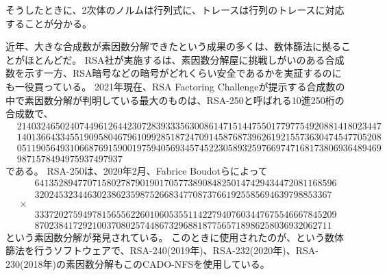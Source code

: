 そうしたときに、2次体のノルムは行列式に、トレースは行列のトレースに対応することが分かる。

近年、大きな合成数が素因数分解できたという成果の多くは、数体篩法に拠ることがほとんどだ。
RSA社が実施するは、素因数分解屋に挑戦しがいのある合成数を示す一方、RSA暗号などの暗号がどれくらい安全であるかを実証するのにも一役買っている。
2021年現在、RSA Factoring Challengeが提示する合成数の中で素因数分解が判明している最大のものは、RSA-250と呼ばれる10進250桁の合成数で、
\begin{align*}
&2140324650240744961264423072839333563008614715144755017797754920881418023447\\
&1401366433455190958046796109928518724709145876873962619215573630474547705208\\
&0511905649310668769159001975940569345745223058932597669747168173806936489469\\
&9871578494975937497937
\end{align*}
である。
RSA-250は、2020年2月、Fabrice Boudotらによって
\begin{align*}
&641352894770715802787901901705773890848250147429434472081168596\\
&32024532344630238623598752668347708737661925585694639798853367\\
\times&\\
&333720275949781565562260106053551142279407603447675546667845209\\
&87023841729210037080257448673296881877565718986258036932062711
\end{align*}
という素因数分解が発見されている。
このときに使用されたのが、という数体篩法を行うソフトウェアで、RSA-240(2019年)、RSA-232(2020年)、RSA-230(2018年)の素因数分解もこのCADO-NFSを使用している。

